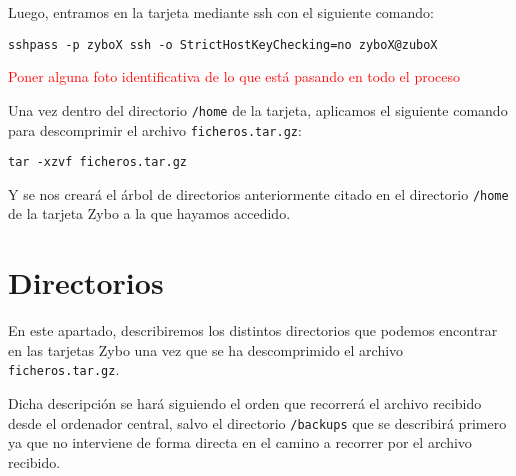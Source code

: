 \documentclass[12pt,letterpaper]{article}
\begin{document}
Luego, entramos en la tarjeta mediante ssh con el siguiente comando:
\begin{center}
	\texttt{sshpass -p zyboX ssh -o StrictHostKeyChecking=no zyboX@zuboX}
\end{center}

\textcolor{red}{Poner alguna foto identificativa de lo que está pasando en todo el proceso\\}

Una vez dentro del directorio \texttt{/home} de la tarjeta, aplicamos el siguiente comando para descomprimir el archivo \texttt{ficheros.tar.gz}:
\begin{center}
	\texttt{tar -xzvf ficheros.tar.gz}
\end{center}

Y se nos creará el árbol de directorios anteriormente citado en el directorio \texttt{/home} de la tarjeta Zybo a la que hayamos accedido.

\section{Directorios}
En este apartado, describiremos los distintos directorios que podemos encontrar en las tarjetas Zybo una vez que se ha descomprimido el archivo \texttt{ficheros.tar.gz}.

Dicha descripción se hará siguiendo el orden que recorrerá el archivo recibido desde el ordenador central, salvo el directorio \texttt{/backups} que se describirá primero ya que no interviene de forma directa en el camino a recorrer por el archivo recibido.
\end{document}
